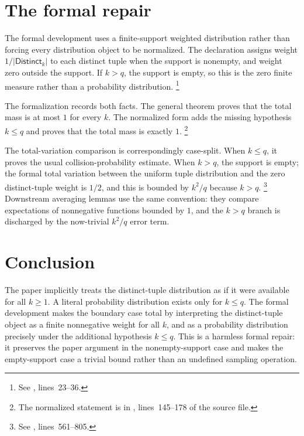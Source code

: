 \documentclass[11pt]{article}
\begin{document}
\section{The formal repair}

The formal development uses a finite-support weighted distribution rather than
forcing every distribution object to be normalized.  The declaration
 assigns weight
$1/|\mathsf{Distinct}_k|$ to each distinct tuple when the support is nonempty, and
weight zero outside the support.  If $k>q$, the support is empty, so this is the
zero finite measure rather than a probability distribution.%
\footnote{See , lines~23--36.}

The formalization records both facts.  The general theorem
proves that the total mass is at most $1$ for every $k$.  The normalized form
adds the missing hypothesis $k\le q$ and proves that the total mass is exactly
$1$.%
\footnote{The normalized statement is in
, lines~145--178 of the
source file.}

The total-variation comparison
 is correspondingly case-split.  When
$k\le q$, it proves the usual collision-probability estimate.  When $k>q$, the
support is empty; the formal total variation between the uniform tuple
distribution and the zero distinct-tuple weight is $1/2$, and this is bounded
by $k^2/q$ because $k>q$.%
\footnote{See , lines~561--805.}
Downstream averaging lemmas use the same convention: they compare expectations
of nonnegative functions bounded by $1$, and the $k>q$ branch is discharged by
the now-trivial $k^2/q$ error term.

\section{Conclusion}

The paper implicitly treats the distinct-tuple distribution as if it were
available for all $k\ge 1$.  A literal probability distribution exists only for
$k\le q$.  The formal development makes the boundary case total by interpreting
the distinct-tuple object as a finite nonnegative weight for all $k$, and as a
probability distribution precisely under the additional hypothesis $k\le q$.
This is a harmless formal repair: it preserves the paper argument in the
nonempty-support case and makes the empty-support case a trivial bound rather
than an undefined sampling operation.



\end{document}
